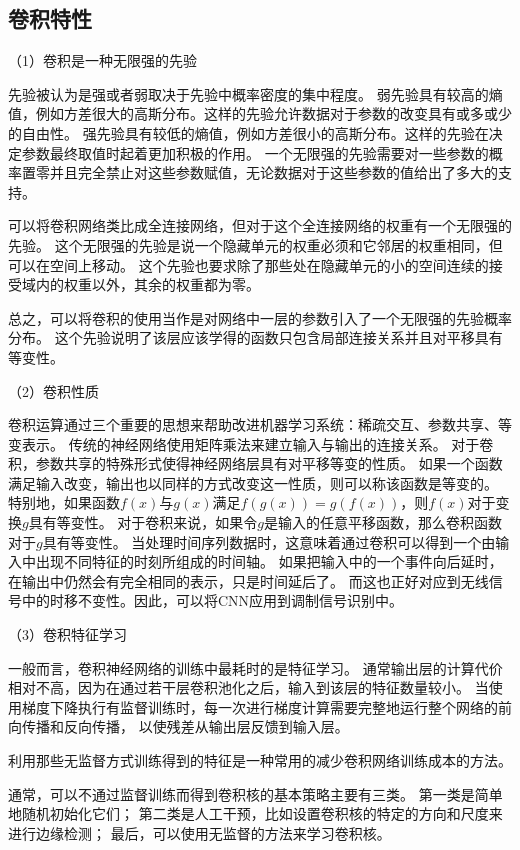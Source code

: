 \subsection{卷积特性}
（1）卷积是一种无限强的先验\par
先验被认为是强或者弱取决于先验中概率密度的集中程度。
弱先验具有较高的熵值，例如方差很大的高斯分布。这样的先验允许数据对于参数的改变具有或多或少的自由性。
强先验具有较低的熵值，例如方差很小的高斯分布。这样的先验在决定参数最终取值时起着更加积极的作用。
一个无限强的先验需要对一些参数的概率置零并且完全禁止对这些参数赋值，无论数据对于这些参数的值给出了多大的支持。\par
可以将卷积网络类比成全连接网络，但对于这个全连接网络的权重有一个无限强的先验。
这个无限强的先验是说一个隐藏单元的权重必须和它邻居的权重相同，但可以在空间上移动。
这个先验也要求除了那些处在隐藏单元的小的空间连续的接受域内的权重以外，其余的权重都为零。\par
总之，可以将卷积的使用当作是对网络中一层的参数引入了一个无限强的先验概率分布。
这个先验说明了该层应该学得的函数只包含局部连接关系并且对平移具有等变性。\par

（2）卷积性质\par
卷积运算通过三个重要的思想来帮助改进机器学习系统：稀疏交互、参数共享、等变表示。
传统的神经网络使用矩阵乘法来建立输入与输出的连接关系。
对于卷积，参数共享的特殊形式使得神经网络层具有对平移等变的性质。
如果一个函数满足输入改变，输出也以同样的方式改变这一性质，则可以称该函数是等变的。
特别地，如果函数$f(x)$与$g(x)$满足$f(g(x))= g(f(x))$，则$f(x)$对于变换$g$具有等变性。
对于卷积来说，如果令$g$是输入的任意平移函数，那么卷积函数对于$g$具有等变性。
当处理时间序列数据时，这意味着通过卷积可以得到一个由输入中出现不同特征的时刻所组成的时间轴。
如果把输入中的一个事件向后延时，在输出中仍然会有完全相同的表示，只是时间延后了。
而这也正好对应到无线信号中的时移不变性。因此，可以将CNN应用到调制信号识别中。\par

（3）卷积特征学习\par
一般而言，卷积神经网络的训练中最耗时的是特征学习。
通常输出层的计算代价相对不高，因为在通过若干层卷积池化之后，输入到该层的特征数量较小。
当使用梯度下降执行有监督训练时，每一次进行梯度计算需要完整地运行整个网络的前向传播和反向传播，
以使残差从输出层反馈到输入层。

利用那些无监督方式训练得到的特征是一种常用的减少卷积网络训练成本的方法。\par

通常，可以不通过监督训练而得到卷积核的基本策略主要有三类。
第一类是简单地随机初始化它们；
第二类是人工干预，比如设置卷积核的特定的方向和尺度来进行边缘检测；
最后，可以使用无监督的方法来学习卷积核。\par

